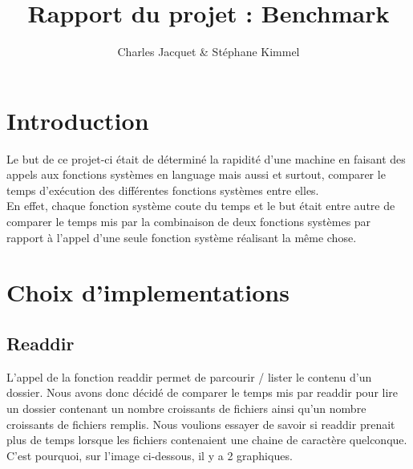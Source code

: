 \documentclass[11pt, oneside]{article}
\title{Rapport du projet : Benchmark}
\author{Charles Jacquet & Stéphane Kimmel}
\begin{document}
\begin{multicols}{2}

\section{Introduction}
Le but de ce projet-ci était de déterminé la rapidité d'une machine en faisant des appels aux fonctions systèmes en language mais aussi et surtout, comparer le temps d'exécution des différentes fonctions systèmes entre elles.  \\
En effet, chaque fonction système coute du temps et le but était entre autre de comparer le temps mis par la combinaison de deux fonctions systèmes par rapport à l'appel d'une seule fonction système réalisant la même chose.

\section{Choix d'implementations}
\subsection{Readdir}
L'appel de la fonction readdir permet de parcourir / lister le contenu d'un dossier. Nous avons donc décidé de comparer le temps mis par readdir pour lire un dossier contenant un nombre croissants de fichiers ainsi qu'un nombre croissants de fichiers remplis. Nous voulions essayer de savoir si readdir prenait plus de temps lorsque les fichiers contenaient une chaine de caractère quelconque. C'est pourquoi, sur l'image ci-dessous, il y a 2 graphiques. \\


\end{multicols}
\end{document}
